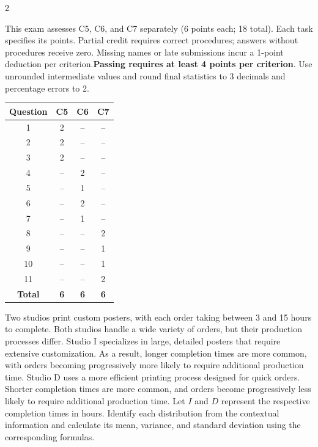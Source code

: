 \vspace{0.1cm}
\StudentInfo
\vspace{-3mm}
\begin{multicols}{2}
	\raggedcolumns
	
\vspace{-0.2cm}
This exam assesses C5, C6, and C7 separately (6 points each; 18 total). Each task specifies its points. Partial credit requires correct procedures; answers without procedures receive zero. Missing names or late submissions incur a 1-point deduction per criterion.\textbf{Passing requires at least 4 points per criterion}. Use unrounded intermediate values and round final statistics to 3 decimals and percentage errors to 2.

\vspace{-9mm}
\begin{center}
	\begin{tabular}{|c|c|c|c|}
		\hline
		\textbf{Question} & \textbf{C5} & \textbf{C6} & \textbf{C7} \\ \hline
		1  & 2  & -- & -- \\ \hline
		2  & 2  & -- & -- \\ \hline
		3  & 2  & -- & -- \\ \hline
		4  & -- & 2  & -- \\ \hline
		5  & -- & 1  & -- \\ \hline
		6  & -- & 2  & -- \\ \hline
		7  & -- & 1  & -- \\ \hline
		8  & -- & -- & 2  \\ \hline
		9  & -- & -- & 1  \\ \hline
		10 & -- & -- & 1  \\ \hline
		11 & -- & -- & 2  \\ \hline
		\textbf{Total} & \textbf{6} & \textbf{6} & \textbf{6} \\ \hline
	\end{tabular}
\end{center}

\vspace{-5mm}
\label{sec:c5-1}
Two studios print custom posters, with each order taking between 3 and 15 hours
to complete. Both studios handle a wide variety of orders, but their production
processes differ.
Studio I specializes in large, detailed posters that require extensive
customization. As a result, longer completion times are more common, with
orders becoming progressively more likely to require additional production
time.
Studio D uses a more efficient printing process designed for quick orders.
Shorter completion times are more common, and orders become progressively
less likely to require additional production time.
Let $I$ and $D$ represent the respective completion times in hours.
Identify each distribution from the contextual information and calculate
its mean, variance, and standard deviation using the corresponding formulas.



\end{multicols}
